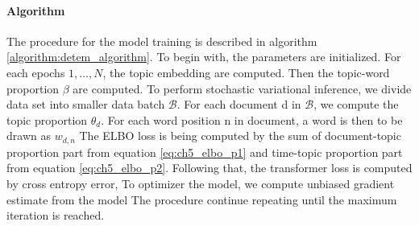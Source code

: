 \paragraph{Algorithm}The procedure for the model training is described in algorithm \ref{algorithm:detem_algorithm}. To begin with, the parameters are initialized.
For each epochs $ 1,\dots, N $, the topic embedding are computed. 
Then the topic-word proportion $ \beta $ are computed.
To perform stochastic variational inference, we divide data set into smaller data batch $ \mathcal{B} $.
For each document d in $ \mathcal{B} $, we compute the topic proportion $ \theta_d $. For each word position n in document, a word is then to be drawn as $ w_{d,n} $
The ELBO loss is being computed by the sum of document-topic proportion part from equation \ref{eq:ch5_elbo_p1} and time-topic proportion part from equation \ref{eq:ch5_elbo_p2}.
Following that, the transformer loss is computed by cross entropy error, 
To optimizer the model, we compute unbiased gradient estimate from the model 
The procedure continue repeating until the maximum iteration is reached.



